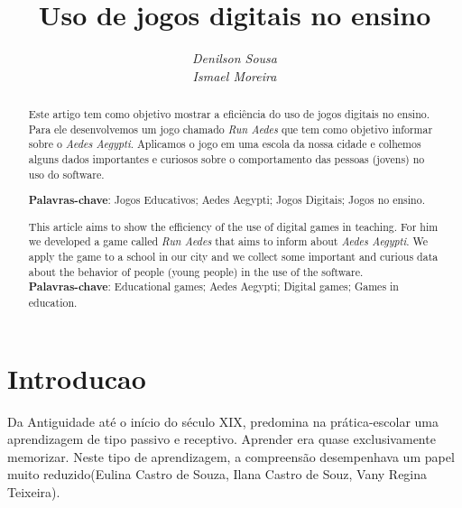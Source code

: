 \documentclass[12pt]{article}
\begin{document}
	
	\title{\textbf{Uso de jogos digitais no ensino}}
	\author{\textit{Denilson Sousa}\\\textit{Ismael Moreira}}
	
	\maketitle %

	\begin{abstract}
		Este artigo tem como objetivo mostrar a eficiência do uso de jogos digitais no ensino. Para ele desenvolvemos um jogo chamado \textit{Run Aedes} que tem como objetivo informar sobre o \textit{Aedes Aegypti}. Aplicamos o jogo em uma escola da nossa cidade e colhemos alguns dados importantes e curiosos sobre o comportamento das pessoas (jovens) no uso do software.
	
		\textbf{Palavras-chave}: Jogos Educativos; Aedes Aegypti; Jogos Digitais;  Jogos no ensino.	
	\end{abstract}


	\begin{abstract}
		This article aims to show the efficiency of the use of digital games in teaching. For him we developed a game called \textit {Run Aedes} that aims to inform about \textit {Aedes Aegypti}. We apply the game to a school in our city and we collect some important and curious data about the behavior of people (young people) in the use of the software. \\
			
		\textbf{Palavras-chave}: Educational games; Aedes Aegypti; Digital games; Games in education.	
	\end{abstract}
	
	
			
			
	\section{Introducao}%
	
	Da Antiguidade até o início do século XIX, predomina na prática-escolar uma aprendizagem de tipo passivo e receptivo. Aprender era quase exclusivamente memorizar. Neste tipo de aprendizagem, a compreensão desempenhava um papel muito reduzido(Eulina Castro de Souza, Ilana Castro de Souz, Vany Regina Teixeira).\\
	
\end{document}
